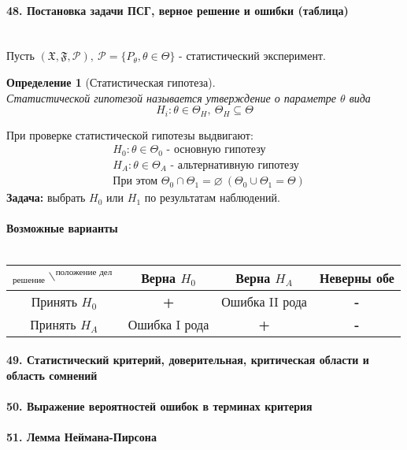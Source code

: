 \documentclass[titlepage]{article}
\newcommand{\sP}{\mathcal{P}}
\newcommand{\sF}{\mathfrak{F}}
\newcommand{\sX}{\mathfrak{X}}
\newtheorem{definition}{Определение}
\begin{document}
\paragraph{48. Постановка задачи ПСГ, верное решение и ошибки (таблица)} ~\\
Пусть $(\sX,\sF,\sP),\ \sP=\{P_\theta,\theta \in \Theta\}$ - статистический эксперимент.
\begin{definition}[Статистическая гипотеза] ~\\
	Статистической гипотезой называется утверждение о параметре $\theta$ вида
	\[H_i:\theta \in \Theta_H,\ \Theta_H \subseteq \Theta\]
\end{definition}
При проверке статистической гипотезы выдвигают:
\begin{align*}
	&H_0: \theta \in \Theta_0 \text{ - основную гипотезу}\\
	&H_A: \theta \in \Theta_A \text{ - альтернативную гипотезу}\\
	&\text{При этом } \Theta_0 \cap \Theta_1 = \varnothing\ (\Theta_0 \cup \Theta_1 = \Theta)
\end{align*}
\textbf{Задача:} выбрать $H_0$ или $H_1$ по результатам наблюдений. ~\\
\\
\textbf{Возможные варианты} ~\\
\\
\begin{tabular}{|c|c|c|c|}
	\hline
	$_\text{решение}\backslash^\text{положение дел}$ & Верна $H_0$ & Верна $H_A$ & Неверны обе \\
	\hline
	Принять $H_0$ & \textbf{+} & Ошибка II рода & \textbf{-} \\
	\hline
	Принять $H_A$ & Ошибка I рода & \textbf{+} & \textbf{-} \\
	\hline
\end{tabular}

\paragraph{49. Статистический критерий, доверительная, критическая области и область сомнений}

\paragraph{50. Выражение вероятностей ошибок в терминах критерия}

\paragraph{51. Лемма Неймана-Пирсона}
\end{document}
